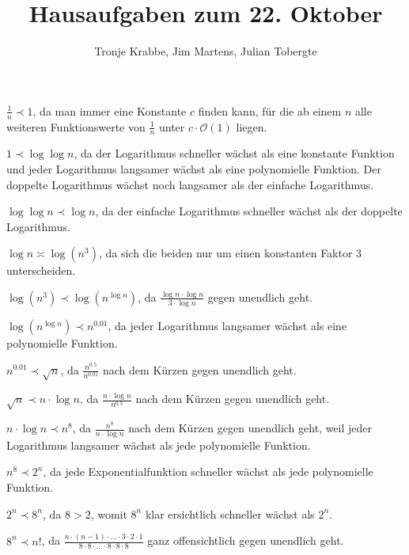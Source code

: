 \documentclass[10pt,a4paper,oneside,ngerman,numbers=noenddot]{scrartcl}
\begin{document}
\author{Tronje Krabbe, Jim Martens, Julian Tobergte}
\title{Hausaufgaben zum 22. Oktober}
\maketitle
\section{} %
	\subsection{} %
	$\frac{1}{n} \prec 1$, da man immer eine Konstante $c$ finden kann, für die ab einem $n$ alle weiteren Funktionswerte von $\frac{1}{n}$ unter $c \cdot \mathcal{O}(1)$ liegen.
	
	$1 \prec \log\log n$, da der Logarithmus schneller wächst als eine konstante Funktion und jeder Logarithmus langsamer wächst als eine polynomielle Funktion. Der doppelte Logarithmus wächst noch langsamer als der einfache Logarithmus.
	
	$\log\log n \prec \log n$, da der einfache Logarithmus schneller wächst als der doppelte Logarithmus.
	
	$\log n \asymp \log(n^{3})$, da sich die beiden nur um einen konstanten Faktor $3$ unterscheiden.
	
	$\log(n^{3}) \prec \log(n^{\log n})$, da $\frac{\log n \cdot \log n}{3 \cdot \log n}$ gegen unendlich geht.
	
	$\log(n^{\log n}) \prec n^{0.01}$, da jeder Logarithmus langsamer wächst als eine polynomielle Funktion.
	
	$n^{0.01} \prec \sqrt{n}$, da $\frac{n^{0.5}}{n^{0.01}}$ nach dem Kürzen gegen unendlich geht.
	
	$\sqrt{n} \prec n \cdot \log n$, da $\frac{n \cdot \log n}{n^{0.5}}$ nach dem Kürzen gegen unendlich geht.
	
	$n \cdot \log n \prec n^{8}$, da $\frac{n^{8}}{n \cdot \log n}$ nach dem Kürzen gegen unendlich geht, weil jeder Logarithmus langsamer wächst als jede polynomielle Funktion.
	
	$n^{8} \prec 2^{n}$, da jede Exponentialfunktion schneller wächst als jede polynomielle Funktion.
	
	$2^{n} \prec 8^{n}$, da $8 > 2$, womit $8^{n}$ klar ersichtlich schneller wächst als $2^{n}$.
	
	$8^{n} \prec n!$, da $\frac{n \cdot (n-1) \cdot ... \cdot 3 \cdot 2 \cdot 1}{8 \cdot 8 \cdot ... \cdot 8 \cdot 8 \cdot 8}$ ganz offensichtlich gegen unendlich geht.
	
\end{document}

